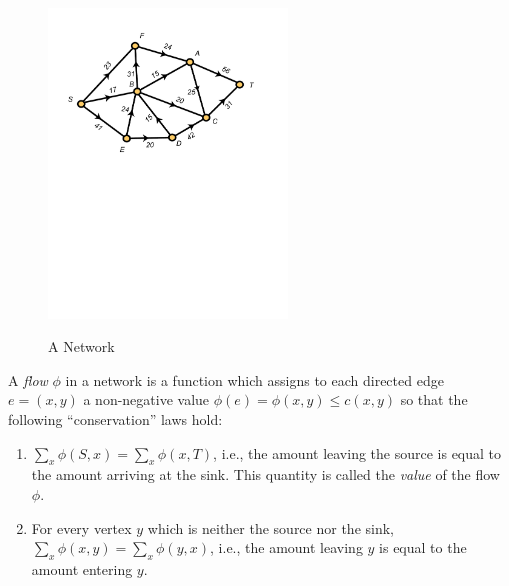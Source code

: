 \begin{figure}
\centering
\includegraphics*[viewport=37 410 531 734,width=2.5in]{networkflow-figs/webfig-31a}\\
\caption{A Network}\label{fig:networkflow:network}
\end{figure}

A \textit{flow} $\phi$ in a network is a function which assigns to
each directed edge $e=(x,y)$ a non-negative value
$\phi(e)=\phi(x,y)\leq c(x,y)$ so that the following ``conservation''
laws hold:

\begin{enumerate}
\item $\sum_{x} \phi(S,x)= \sum_{x} \phi(x,T)$, i.e., the amount leaving
the source is equal to the amount arriving at the sink.  This quantity
is called the \textit{value} of the flow $\phi$.
\item For every vertex $y$ which is neither the source nor the
sink, $\sum_{x}\phi(x,y)= \sum_{x}\phi(y,x)$, i.e., the amount leaving $y$ 
is equal to the amount entering $y$.
\end{enumerate}

